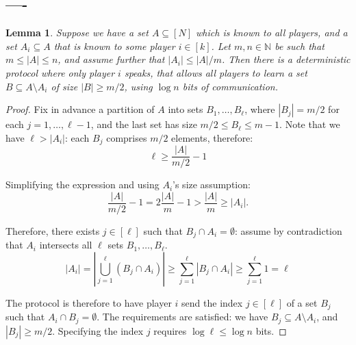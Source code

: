 \documentclass{article}
\newcommand{\nat}{\mathbb{N}}
\theoremstyle{plain}
\newtheorem{lemma}[theorem]{Lemma}
\begin{document}
\subsection{----}

\begin{lemma}
  Suppose we have a set $A \subseteq [N]$ which is known to all players, and a set $A_i \subseteq A$ that is known to some player $i \in [k]$.
  Let $m, n \in \nat$ be such that $m \leq |A| \leq n$, and assume further that $|A_i| \leq |A|/m$.
  Then there is a deterministic protocol where only player $i$ speaks,
  that allows all players to learn a set $B \subseteq A \setminus A_i$
  of size $|B| \geq m/2$,
  using $\log n$ bits of communication.
  \label{lemma:reveal_zeroes}
\end{lemma}
\begin{proof}
  Fix in advance a partition of $A$ into sets $B_1,\ldots,B_{\ell}$,
  where $|B_j| = m/2$ for each $j = 1,\ldots,\ell-1$,
  and the last set has size $m/2 \leq B_{\ell} \leq m - 1$.
  Note that we have $\ell > |A_i|$: \newline
  each $B_j$ comprises $m/2$ elements, therefore:
  \begin{equation*}
    \ell \geq \frac{|A|}{m/2} - 1
  \end{equation*}
  
  Simplifying the expression and using $A_i$'s size assumption:
  \begin{equation*}
    \frac{|A|}{m/2} - 1 =  2\frac{|A|}{m} - 1 > \frac{|A|}{m} \geq |A_i|.
  \end{equation*}
   
  
  Therefore, there exists $j \in [\ell]$ such that $B_j \cap A_i = \emptyset$:
  assume by contradiction that $A_i$ intersects all $\ell$ sets $B_1,\ldots,B_{\ell}$. 
  \begin{equation*}
  |A_i| = |\bigcup_{j=1}^{\ell}\left(B_j \cap A_i \right)| \geq \sum_{j=1}^{\ell} |B_j \cap A_i| \geq \sum_{j=1}^{\ell}1 = \ell
  \end{equation*}

  The protocol is therefore to have player $i$ send the index $j \in [\ell]$ of a set $B_j$
  such that $A_i \cap B_j = \emptyset$.
  The requirements are satisfied: we have $B_j \subseteq A \setminus A_i$,
  and $|B_j| \geq m / 2$.
  Specifying the index $j$ requires $\log \ell \leq \log n$ bits.
  
\end{proof}
\end{document}

